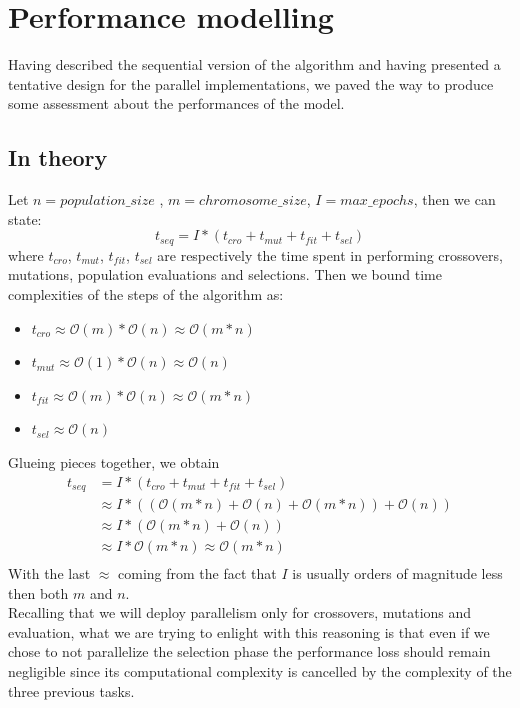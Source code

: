 \documentclass[11pt]{article}
\begin{document}
\section{Performance modelling}
Having described the sequential version of the algorithm and having presented a tentative design for the parallel implementations, we paved the way to produce some assessment	 about the performances of the model.
\subsection{In theory}
Let $ n = population\_size$ , $m=chromosome\_size$, $ I = max\_epochs $, then we can state:
\[t_{seq} = I * (t_{cro} + t_{mut} + t_{fit} + t_{sel}) \]
where $ t_{cro}$, $ t_{mut}$, $t_{fit}$, $t_{sel}$ are respectively the time spent in performing crossovers, mutations, population evaluations and selections. Then we bound time complexities of the steps of the algorithm as:
\\ \medskip
\begin{itemize}
	\item $ t_{cro} \approx \mathcal{O}(m) * \mathcal{O}(n) \approx \mathcal{O}(m*n) $
	\item $ t_{mut} \approx \mathcal{O}(1) * \mathcal{O}(n) \approx \mathcal{O}(n) $
	\item $ t_{fit} \approx \mathcal{O}(m) * \mathcal{O}(n) \approx \mathcal{O}(m*n) $
	\item $ t_{sel} \approx \mathcal{O}(n)$
\end{itemize}
Glueing pieces together, we obtain
\begin{align*}
t_{seq} &= I * (t_{cro} + t_{mut} + t_{fit} + t_{sel}) \\
& \approx I * ((\mathcal{O}(m*n) + \mathcal{O}(n) + \mathcal{O}(m*n)) + \mathcal{O}(n))\\
& \approx I * (\mathcal{O}(m*n) + \mathcal{O}(n)) \\
& \approx I * \mathcal{O}(m*n) \approx \mathcal{O}(m*n)\\
\end{align*}
With the last $ \approx $ coming from the fact that $ I $ is usually orders of magnitude less then both $ m $ and $ n $. \\
Recalling that we will deploy parallelism only for crossovers, mutations and evaluation,
what we are trying to enlight with this reasoning is that even if we chose to not parallelize the selection phase the performance loss should remain negligible since its computational complexity is cancelled by the complexity of the three previous tasks.
\end{document}
